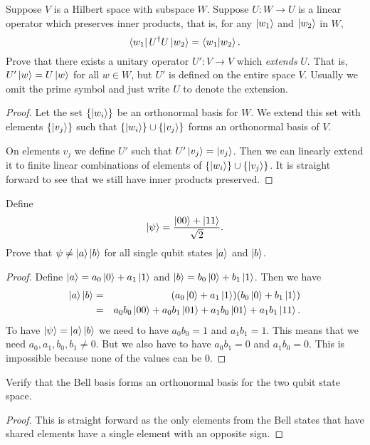 \documentclass{article}
\begin{document}
\begin{exercise}
  Suppose $V$ is a Hilbert space with subspace $W$. Suppose $U:W\rightarrow U$ is a linear operator which preserves inner products, that is, for any $\ket{w_1}$ and $\ket{w_2}$ in $W$,
  \[\bra{w_1}U^\dagger U\ket{w_2}=\braket{w_1}{w_2}.\]
  Prove that there exists a unitary operator $U':V\rightarrow V$ which \textit{extends} $U$. That is, $U'\ket{w}=U\ket{w}$ for all $w\in W$, but $U'$ is defined on the entire space $V$. Usually we omit the prime symbol and just write $U$ to denote the extension.
  \begin{proof}
    Let the set $\{\ket{w_i}\}$ be an orthonormal basis for $W$. We extend this set with elements $\{\ket{v_j}\}$ such that $\{\ket{w_i}\}\cup \{\ket{v_j}\}$ forms an orthonormal basis of $V$.

    On elements $v_j$ we define $U'$ such that $U'\ket{v_j}=\ket{v_j}$. Then we can linearly extend it to finite linear combinations of elements of $\{\ket{w_i}\}\cup \{\ket{v_j}\}$. It is straight forward to see that we still have inner products preserved.
  \end{proof}
\end{exercise}

\begin{exercise}
  Define
  \[\ket\psi = \frac{\ket{00}+\ket{11}}{\sqrt2}.\]
  Prove that $\psi\ne\ket{a}\ket{b}$ for all single qubit states $\ket{a}$ and $\ket{b}$.
  \begin{proof}
    Define $\ket{a}=a_0\ket0+a_1\ket1$ and $\ket{b}=b_0\ket0+b_1\ket1$. Then we have
    \begin{eqnarray*}
      \ket{a}\ket{b}&=&(a_0\ket0+a_1\ket1)(b_0\ket0+b_1\ket1) \\
      &=&a_0b_0\ket{00}+a_0b_1\ket{01}+a_1b_0\ket{01}+a_1b_1\ket{11}.
    \end{eqnarray*}
    To have $\ket{\psi}=\ket{a}\ket{b}$ we need to have $a_0b_0=1$ and $a_1b_1=1$. This means that we need $a_0,a_1,b_0,b_1\ne0$. But we also have to have $a_0b_1=0$ and $a_1b_0=0$. This is impossible because none of the values can be $0$.
  \end{proof}
\end{exercise}

\begin{exercise}
  Verify that the Bell basis forms an orthonormal basis for the two qubit state space.
  \begin{proof}
    This is straight forward as the only elements from the Bell states that have shared elements have a single element with an opposite sign.
  \end{proof}
\end{exercise}
\end{document}

